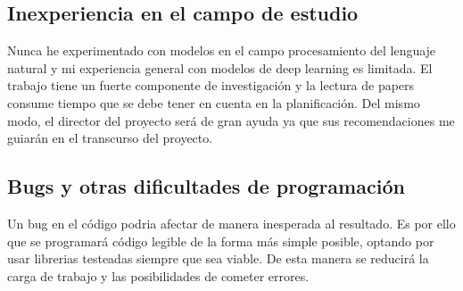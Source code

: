 \subsection{Inexperiencia en el campo de estudio}
Nunca he experimentado con modelos en el campo procesamiento del lenguaje natural
y mi experiencia general con modelos de deep learning es limitada. El trabajo tiene un fuerte componente
de investigación y la lectura de papers consume tiempo que se debe tener en cuenta en la
planificación.
Del mismo modo, el director del proyecto será de gran ayuda ya que sus recomendaciones me guiarán en el
transcurso del proyecto.
\subsection{Bugs y otras dificultades de programación}
Un bug en el código podria afectar de manera inesperada al resultado. Es por ello
que se programará código legible de la forma más simple posible, optando por usar librerias testeadas siempre
que sea viable. De esta manera se reducirá la carga de trabajo y las posibilidades de cometer errores.
